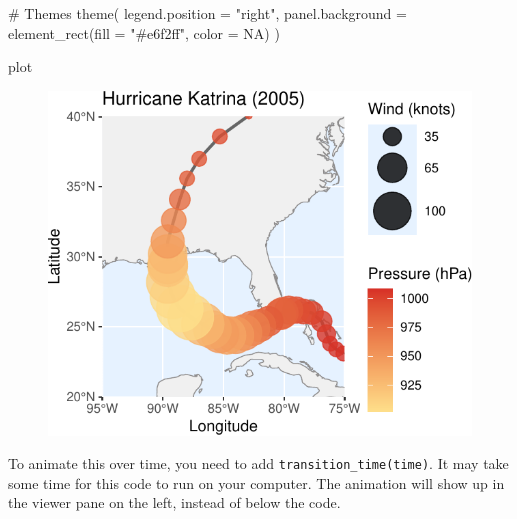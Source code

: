 \documentclass[
  letterpaper,
  DIV=11,
  numbers=noendperiod]{scrartcl}
\newenvironment{Shaded}{\begin{snugshade}}{\end{snugshade}}
\newcommand{\AttributeTok}[1]{\textcolor[rgb]{0.40,0.45,0.13}{#1}}
\newcommand{\CommentTok}[1]{\textcolor[rgb]{0.37,0.37,0.37}{#1}}
\newcommand{\ConstantTok}[1]{\textcolor[rgb]{0.56,0.35,0.01}{#1}}
\newcommand{\FunctionTok}[1]{\textcolor[rgb]{0.28,0.35,0.67}{#1}}
\newcommand{\NormalTok}[1]{\textcolor[rgb]{0.00,0.23,0.31}{#1}}
\newcommand{\SpecialCharTok}[1]{\textcolor[rgb]{0.37,0.37,0.37}{#1}}
\newcommand{\StringTok}[1]{\textcolor[rgb]{0.13,0.47,0.30}{#1}}
\begin{document}
\begin{Shaded}
\begin{Highlighting}[]
  \CommentTok{\# Themes}
  \FunctionTok{theme}\NormalTok{(}
    \AttributeTok{legend.position =} \StringTok{"right"}\NormalTok{,}
    \AttributeTok{panel.background =} \FunctionTok{element\_rect}\NormalTok{(}\AttributeTok{fill =} \StringTok{"\#e6f2ff"}\NormalTok{, }\AttributeTok{color =} \ConstantTok{NA}\NormalTok{)}
\NormalTok{  )}

\NormalTok{plot}
\end{Highlighting}
\end{Shaded}

\begin{figure}[H]

{\centering \includegraphics{118_gganimate_files/figure-pdf/unnamed-chunk-6-1.pdf}

}

\end{figure}

To animate this over time, you need to add
\texttt{transition\_time(time)}. It may take some time for this code to
run on your computer. The animation will show up in the viewer pane on
the left, instead of below the code.

\begin{Shaded}
\end{Shaded}
\end{document}
